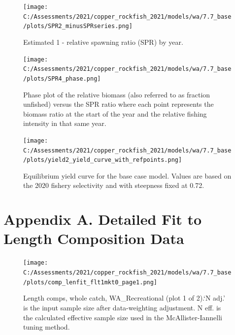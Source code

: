 \documentclass[11pt,
  english,
  a4paper,
]{article}
\begin{document}
\tagmcend\tagstructend

\clearpage


\begin{figure}
\centering
\texttt{[image: C:/Assessments/2021/copper\_rockfish\_2021/models/wa/7.7\_base/plots/SPR2\_minusSPRseries.png]}
\caption{Estimated 1 - relative spawning ratio (SPR) by year.\label{fig:1-spr}}
\end{figure}

\tagmcend\tagstructend


\begin{figure}
\centering
\texttt{[image: C:/Assessments/2021/copper\_rockfish\_2021/models/wa/7.7\_base/plots/SPR4\_phase.png]}
\caption{Phase plot of the relative biomass (also referred to as fraction unfished) versus the SPR ratio where each point represents the biomass ratio at the start of the year and the relative fishing intensity in that same year.\label{fig:phase}}
\end{figure}

\tagmcend\tagstructend


\begin{figure}
\centering
\texttt{[image: C:/Assessments/2021/copper\_rockfish\_2021/models/wa/7.7\_base/plots/yield2\_yield\_curve\_with\_refpoints.png]}
\caption{Equilibrium yield curve for the base case model. Values are based on the 2020 fishery selectivity and with steepness fixed at 0.72.\label{fig:yield}}
\end{figure}

\tagmcend\tagstructend

\clearpage


\hypertarget{length-fit}{%
\section{Appendix A. Detailed Fit to Length Composition Data}\label{length-fit}}

\leavevmode\tagmcend\tagstructend


\begin{figure}
\centering
\texttt{[image: C:/Assessments/2021/copper\_rockfish\_2021/models/wa/7.7\_base/plots/comp\_lenfit\_flt1mkt0\_page1.png]}
\caption{Length comps, whole catch, WA\_Recreational (plot 1 of 2).`N adj.' is the input sample size after data-weighting adjustment. N eff. is the calculated effective sample size used in the McAllister-Iannelli tuning method.\label{fig:comp_lenfit_flt1mkt0_page1}}
\end{figure}
\end{document}
